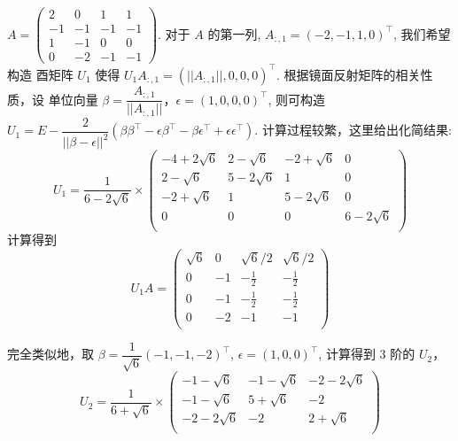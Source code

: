 \documentclass{article}
\begin{document}
\begin{spacing}{1.5}
\begin{itemize}
    $A = \left(\begin{array}{cccc}2&0&1&1\\-1&-1&-1&-1\\1&-1&0&0\\0&-2&-1&-1\end{array}\right)$.
    对于 $A$ 的第一列, $A_{:,1} = (-2, -1, 1, 0)^\top$, 我们希望构造 酉矩阵 $U_1$ 使得 $U_1 A_{:,1} = (||A_{:,1}||, 0, 0, 0)^\top$.
    根据镜面反射矩阵的相关性质，设 单位向量 $\beta = \dfrac{A_{:, 1}}{||A_{:,1}||}$，$\epsilon = (1, 0, 0, 0)^\top$, 则可构造 $U_1 = E - \dfrac{2}{||\beta-\epsilon||^2}(\beta\beta^\top - \epsilon\beta^\top - \beta\epsilon^\top + \epsilon\epsilon^\top)$.
    计算过程较繁，这里给出化简结果: $$U_1 = \dfrac{1}{6-2\sqrt{6}}\times
    \left(\begin{array}{cccc}
        -4+2\sqrt{6}&2-\sqrt{6}&-2+\sqrt{6}&0\\
        2-\sqrt{6}&5-2\sqrt{6}&1&0\\
        -2+\sqrt{6}&1&5-2\sqrt{6}&0\\
        0&0&0&6-2\sqrt{6} \\
    \end{array}\right)$$
    计算得到 $$U_1A = \left(\begin{array}{cccc}
        \sqrt{6} & 0 & \sqrt{6}/2 & \sqrt{6}/2\\
        0 & -1 & -\frac{1}{2} & -\frac{1}{2} \\
        0 & -1 & -\frac{1}{2} & -\frac{1}{2} \\
        0 & -2 & -1 & -1 \\
    \end{array}\right)$$

    完全类似地，取 $\beta = \dfrac{1}{\sqrt 6}(-1, -1, -2)^\top$, $\epsilon = (1, 0, 0)^\top$, 计算得到 $3$ 阶的 $U_2$， 
    $$U_2=\dfrac{1}{6+\sqrt{6}}\times
    \left(\begin{array}{ccc}
        -1-\sqrt{6} & -1-\sqrt{6} & -2-2\sqrt{6}\\
        -1-\sqrt{6} & 5+\sqrt{6} & -2 \\
        -2-2\sqrt{6} & -2 & 2+\sqrt 6 \\
    \end{array}\right)$$


\end{itemize}
\end{spacing}
\end{document}
